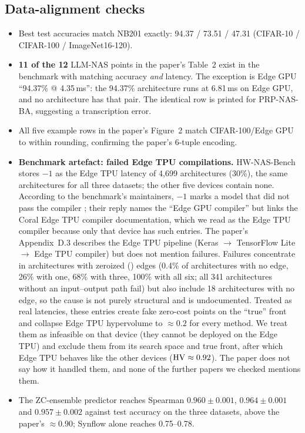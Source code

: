 \subsection{Data-alignment checks}\label{sec:align}
\begin{itemize}[nosep]
  \item Best test accuracies match NB201 exactly: 94.37 / 73.51 / 47.31 (CIFAR-10 / CIFAR-100 / ImageNet16-120).
  \item \textbf{11 of the 12} LLM-NAS points in the paper's Table~2 exist in the benchmark with matching accuracy \emph{and} latency. The exception is Edge GPU ``94.37\% @ 4.35\,ms'': the 94.37\% architecture  runs at 6.81\,ms on Edge GPU, and no architecture has that pair. The identical row is printed for PRP-NAS-BA, suggesting a transcription error.
  \item All five example rows in the paper's Figure~2 match CIFAR-100/Edge GPU to within rounding, confirming the paper's 6-tuple encoding.
  \item \textbf{Benchmark artefact: failed Edge TPU compilations.} HW-NAS-Bench stores $-1$ as the Edge TPU latency of 4{,}699 architectures (30\%), the same architectures for all three datasets; the other five devices contain none. According to the benchmark's maintainers, $-1$ marks a model that did not pass the compiler \cite{hwnasissue}; their reply names the ``Edge GPU compiler'' but links the Coral Edge TPU compiler documentation, which we read as the Edge TPU compiler because only that device has such entries. The paper's Appendix~D.3 describes the Edge TPU pipeline (Keras $\to$ TensorFlow Lite $\to$ Edge TPU compiler) but does not mention failures. Failures concentrate in architectures with zeroized () edges (0.4\% of architectures with no  edge, 26\% with one, 68\% with three, 100\% with all six; all 341 architectures without an input--output path fail) but also include 18 architectures with no  edge, so the cause is not purely structural and is undocumented. Treated as real latencies, these entries create fake zero-cost points on the ``true'' front and collapse Edge TPU hypervolume to $\approx0.2$ for every method. We treat them as infeasible on that device (they cannot be deployed on the Edge TPU) and exclude them from its search space and true front, after which Edge TPU behaves like the other devices ($\mathrm{HV}\approx0.92$). The paper does not say how it handled them, and none of the further papers we checked mentions them.
  \item The ZC-ensemble predictor reaches Spearman $0.960\pm0.001$, $0.964\pm0.001$ and $0.957\pm0.002$ against test accuracy on the three datasets, above the paper's $\approx0.90$; Synflow alone reaches 0.75--0.78.
\end{itemize}


